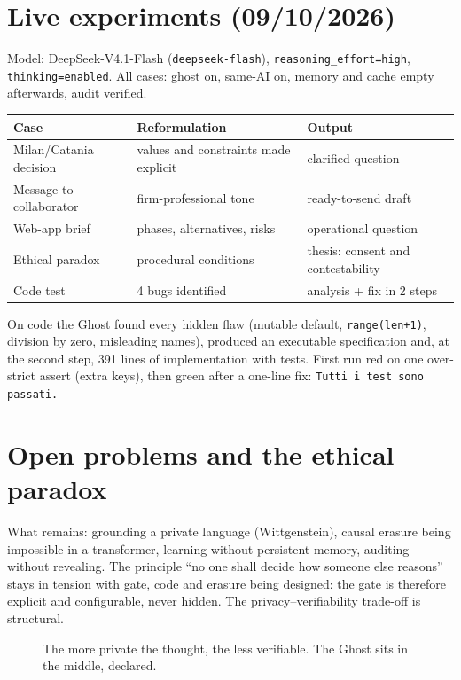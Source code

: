 \documentclass[11pt,a4paper]{article}
\begin{document}
\section{Live experiments (09/10/2026)}
Model: DeepSeek-V4.1-Flash (\texttt{deepseek-flash}), \texttt{reasoning\_effort=high},
\texttt{thinking=enabled}. All cases: ghost on, same-AI on, memory and cache empty
afterwards, audit verified.

\begin{center}
\begin{tabular}{lll}
\toprule
Case & Reformulation & Output \\
\midrule
Milan/Catania decision & values and constraints made explicit & clarified question \\
Message to collaborator & firm-professional tone & ready-to-send draft \\
Web-app brief & phases, alternatives, risks & operational question \\
Ethical paradox & procedural conditions & thesis: consent and contestability \\
Code test & 4 bugs identified & analysis + fix in 2 steps \\
\bottomrule
\end{tabular}
\end{center}

On code the Ghost found every hidden flaw (mutable default, \texttt{range(len+1)},
division by zero, misleading names), produced an executable specification and, at the
second step, 391 lines of implementation with tests. First run red on one over-strict
assert (extra keys), then green after a one-line fix: \texttt{Tutti i test sono passati.}

\section{Open problems and the ethical paradox}
What remains: grounding a private language (Wittgenstein), causal erasure being
impossible in a transformer, learning without persistent memory, auditing without
revealing. The principle ``no one shall decide how someone else reasons'' stays in
tension with gate, code and erasure being designed: the gate is therefore explicit and
configurable, never hidden. The privacy--verifiability trade-off is structural.

\begin{figure}[h]
\centering
{}
\caption{The more private the thought, the less verifiable. The Ghost sits in the middle, declared.}
\end{figure}
\end{document}
